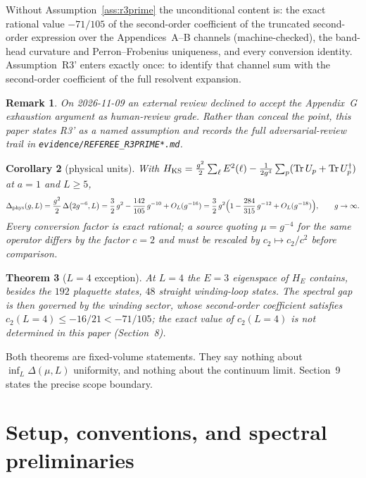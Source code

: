 \documentclass[11pt]{article}
\newtheorem{theorem}{Theorem}[section]
\newtheorem{corollary}[theorem]{Corollary}
\newtheorem{remark}[theorem]{Remark}
\newcommand{\Tr}{\operatorname{Tr}}
\begin{document}
Without Assumption~\ref{ass:r3prime} the unconditional content is: the exact
rational value $-71/105$ of the second-order coefficient of the truncated
second-order expression over the Appendices~A--B channels (machine-checked),
the band-head curvature and Perron--Frobenius uniqueness, and every
conversion identity. Assumption~R3' enters exactly once: to identify that
channel sum with the second-order coefficient of the full resolvent
expansion.
\begin{remark}
On 2026-11-09 an external review declined to accept the Appendix~G
exhaustion argument as human-review grade. Rather than conceal the point,
this paper states R3' as a named assumption and records the full
adversarial-review trail in \texttt{evidence/REFEREE\_R3PRIME*.md}.
\end{remark}

\begin{corollary}[physical units]\label{cor:phys}
With $H_{\rm KS}=\frac{g^2}{2}\sum_\ell E^2(\ell)-\frac{1}{2g^4}\sum_p
(\Tr U_p+\Tr U_p^\dagger)$ at $a=1$ and $L\ge5$,
\[
\Delta_{\rm phys}(g,L)
=\frac{g^2}{2}\,\Delta\bigl(2g^{-6},L\bigr)
=\frac{3}{2}\,g^{2}-\frac{142}{105}\,g^{-10}+O_L(g^{-16})
=\frac{3}{2}\,g^{2}\Bigl(1-\frac{284}{315}\,g^{-12}+O_L(g^{-18})\Bigr),
\qquad g\to\infty .
\]
Every conversion factor is exact rational; a source quoting
$\mu=g^{-4}$ for the same operator differs by the factor $c=2$ and must be
rescaled by $c_2\mapsto c_2/c^{2}$ before comparison.
\end{corollary}

\begin{theorem}[$L=4$ exception]\label{thm:L4}
At $L=4$ the $E=3$ eigenspace of $H_E$ contains, besides the $192$
plaquette states, $48$ straight winding-loop states. The spectral gap is then
governed by the winding sector, whose second-order coefficient satisfies
$c_2(L{=}4)\le -16/21<-71/105$; the exact value of $c_2(L{=}4)$ is not
determined in this paper (Section~8).
\end{theorem}

Both theorems are fixed-volume statements. They say nothing about
$\inf_L\Delta(\mu,L)$ uniformity, and nothing about the continuum limit.
Section~9 states the precise scope boundary.

\section{Setup, conventions, and spectral preliminaries}\label{sec:setup}
\end{document}
